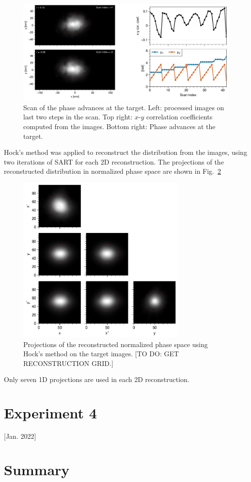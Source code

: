 \begin{figure}[!p]
    \centering
    \includegraphics[width=\textwidth]{Images/chapter5/exp3/target_scan/target_scan.png}
    \caption{Scan of the phase advances at the target. Left: processed images on last two steps in the scan. Top right: $x$-$y$ correlation coefficients computed from the images. Bottom right: Phase advances at the target.}
    \label{fig:exp3_target_scan}
\end{figure}
%

Hock's method was applied to reconstruct the distribution from the images, using two iterations of SART for each 2D reconstruction. The projections of the reconstructed distribution in normalized phase space are shown in Fig.~\ref{fig:exp3_rec_corner_Hock}
%
\begin{figure}[!p]
    \centering
    \includegraphics[width=0.75\textwidth]{Images/chapter5/exp3/target_scan/rec_corner_Hock.png}
    \caption{Projections of the reconstructed normalized phase space using Hock's method on the target images. [TO DO: GET RECONSTRUCTION GRID.]}
    \label{fig:exp3_rec_corner_Hock}
\end{figure}
%
Only seven 1D projections are used in each 2D reconstruction. 





\section{Experiment 4}

[Jan. 2022]


\section{Summary}